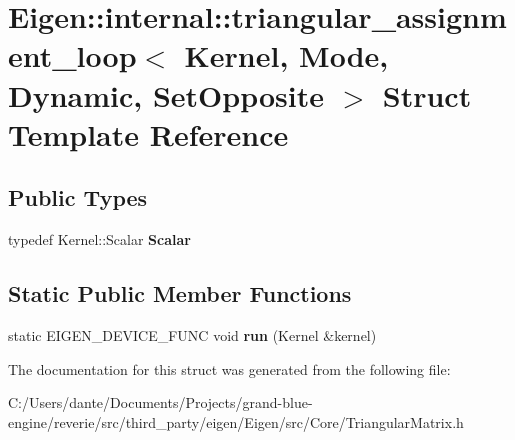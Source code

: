 \hypertarget{struct_eigen_1_1internal_1_1triangular__assignment__loop_3_01_kernel_00_01_mode_00_01_dynamic_00_01_set_opposite_01_4}{}\section{Eigen\+::internal\+::triangular\+\_\+assignment\+\_\+loop$<$ Kernel, Mode, Dynamic, Set\+Opposite $>$ Struct Template Reference}
\label{struct_eigen_1_1internal_1_1triangular__assignment__loop_3_01_kernel_00_01_mode_00_01_dynamic_00_01_set_opposite_01_4}
\subsection*{Public Types}
\begin{DoxyCompactItemize}
\item 
\mbox{\label{struct_eigen_1_1internal_1_1triangular__assignment__loop_3_01_kernel_00_01_mode_00_01_dynamic_00_01_set_opposite_01_4_a6bf5755b404347b4d5047db18d2e1a95}} 
typedef Kernel\+::\+Scalar {\bfseries Scalar}
\end{DoxyCompactItemize}
\subsection*{Static Public Member Functions}
\begin{DoxyCompactItemize}
\item 
\mbox{\label{struct_eigen_1_1internal_1_1triangular__assignment__loop_3_01_kernel_00_01_mode_00_01_dynamic_00_01_set_opposite_01_4_a3f585656bbe3843283d82df37ee5ac34}} 
static E\+I\+G\+E\+N\+\_\+\+D\+E\+V\+I\+C\+E\+\_\+\+F\+U\+NC void {\bfseries run} (Kernel \&kernel)
\end{DoxyCompactItemize}


The documentation for this struct was generated from the following file\+:\begin{DoxyCompactItemize}
\item 
C\+:/\+Users/dante/\+Documents/\+Projects/grand-\/blue-\/engine/reverie/src/third\+\_\+party/eigen/\+Eigen/src/\+Core/Triangular\+Matrix.\+h\end{DoxyCompactItemize}
